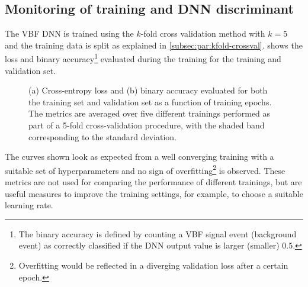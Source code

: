 \subsection{Monitoring of training and DNN discriminant}
\label{subsec:performance-metrics}
The VBF DNN is trained using the $k$-fold cross validation method with $k=5$ and the training data is split as explained in \cref{subsec:par:kfold-crossval}.
 shows the loss and binary accuracy\footnote{The binary accuracy is defined by counting a VBF signal event (background event) as correctly classified if the DNN output value is larger (smaller) 0.5.
} evaluated during the training for the training and validation set.
\begin{figure}[ht]
    \caption{(a) Cross-entropy loss and (b) binary accuracy evaluated for both the training set and validation set as a function of training epochs. The metrics are averaged over five different trainings performed as part of a 5-fold cross-validation procedure, with the shaded band corresponding to the standard deviation.}
    \label{fig:monitoring}
\end{figure}
The curves shown look as expected from a well converging training with a suitable set of hyperparameters and no sign of overfitting\footnote{Overfitting would be reflected in a diverging validation loss after a certain epoch.} is observed. These metrics are not used for comparing the performance of different trainings, but are useful measures to improve the training settings, for example, to choose a suitable learning rate.  

